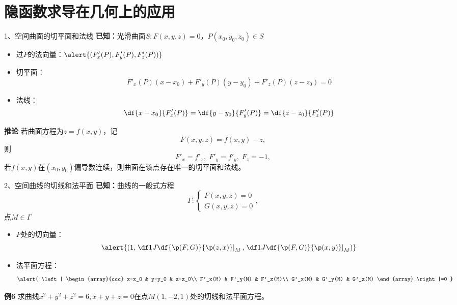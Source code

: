 \section{隐函数求导在几何上的应用}

\begin{frame}{1、空间曲面的切平面和法线}
	\linespread{1.2}\pause 
	{\bf 已知：}光滑曲面$S:F(x,y,z)=0$，$P(x_0,y_0,z_0)\in S$\pause 
	\begin{itemize}
	  \item {\bb 过$P$的法向量：}\pause $\alert{(F'_x(P),F'_y(P),F'_z(P))}$\pause 
	  \item {\bb 切平面：}
	  	$$F'_x(P)(x-x_0)+F'_y(P)(y-y_0)+F'_z(P)(z-z_0)=0$$\pause 
	  \item {\bb 法线：}
	  	$$\df{x-x_0}{F'_x(P)}=\df{y-y_0}{F'_y(P)}=\df{z-z_0}{F'_z(P)}$$
	\end{itemize}
\end{frame}

\begin{frame}
	\linespread{1.2}
	\begin{block}{{\bf 推论}\hfill}
		若曲面方程为$z=f(x,y)$，\pause 记
		$$F(x,y,z)=f(x,y)-z,$$\pause 则
		$$F'_x=f'_x,\;F'_y=f'_y,\;F_z=-1,$$
		\pause 若$f(x,y)$在$(x_0,y_0)$偏导数连续，则曲面在该点存在唯一的切平面和法线。
	\end{block}
\end{frame}

\begin{frame}{2、空间曲线的切线和法平面}
	\linespread{1.2}\pause 
	{\bf 已知：}曲线的一般式方程
	$$\Gamma: \left\{\begin{array}{l}
		F(x,y,z)=0\\ G(x,y,z)=0
	\end{array}\right.,$$
	点$M\in\Gamma$\pause 
	\begin{itemize}
	  \item {\bb $P$处的切向量：}\pause 
	  $$\alert{\left(1,\left.\df 1J\df{\p(F,G)}{\p(z,x)}\right|_M,
	  \left.\df 1J\df{\p(F,G)}{\p(x,y)}\right|_M\right)}$$
	\end{itemize}
\end{frame}

\begin{frame}
	\linespread{1.5}
	\begin{itemize}
	  \item {\bb 法平面方程：}\pause 
	  $$\alert{
	  	\left|
	  		\begin{array}{ccc}
	  			x-x_0 & y-y_0 & z-z_0\\
	  			F'_x(M) & F'_y(M) & F'_z(M)\\
	  			G'_x(M) & G'_y(M) & G'_z(M)
	  		\end{array}
	  	\right|=0
	  }$$
	\end{itemize}\pause 
	\begin{exampleblock}{{\bf 例6}\hfill}
		求曲线$x^2+y^2+z^2=6,x+y+z=0$在点$M(1,-2,1)$处的切线和法平面方程。
	\end{exampleblock}
\end{frame}

